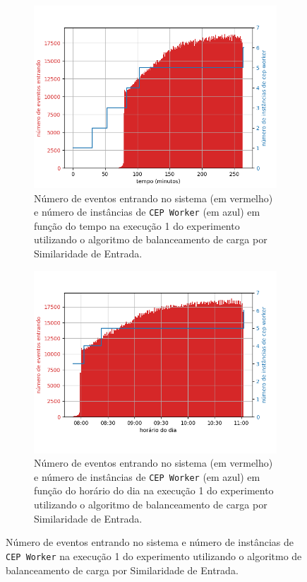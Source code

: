\begin{figure}[h]
\centering
\begin{subfigure}{0.9\textwidth}
\centering
\includegraphics[width=\textwidth]{figuras/graphics/carga_e_workers_total6-dez-is.png}
\caption{Número de eventos entrando no sistema (em vermelho) e número de instâncias de \texttt{CEP Worker} (em azul) em função do tempo na execução 1 do experimento utilizando o algoritmo de balanceamento de carga por Similaridade de Entrada.}
\label{fig:workers_and_load_total-6-dez-is}
\end{subfigure}%

\begin{subfigure}{\textwidth}
\centering
\includegraphics[width=\textwidth]{figuras/graphics/carga_e_workers_horario6-dez-is.png}
\caption{Número de eventos entrando no sistema (em vermelho) e número de instâncias de \texttt{CEP Worker} (em azul) em função do horário do dia na execução 1 do experimento utilizando o algoritmo de balanceamento de carga por Similaridade de Entrada.}
\label{fig:workers_and_load_SPtrans-6-dez-is}
\end{subfigure}%
\caption{Número de eventos entrando no sistema e número de instâncias de \texttt{CEP Worker} na execução 1 do experimento utilizando o algoritmo de balanceamento de carga por Similaridade de Entrada.}
\end{figure}



